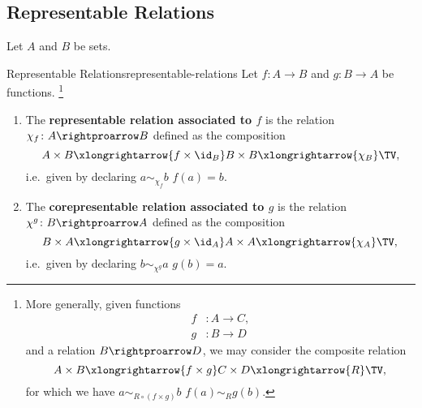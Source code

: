 \subsection{Representable Relations}\label{subsection-representable-relations}
Let $A$ and $B$ be sets.
\begin{definition}{Representable Relations}{representable-relations}%
    Let $f\colon A\to B$ and $g\colon B\to A$ be functions.%
    \footnote{%
        More generally, given functions
        \begin{align*}
            f &\colon A \to C,\\
            g &\colon B \to D
        \end{align*}
        and a relation $B\rightproarrow D$, we may consider the composite relation
        \[
            A\times B%
            \xlongrightarrow{f\times g}%
            C\times D%
            \xlongrightarrow{R}%
            \TV,%
        \]%
        for which we have $a\sim_{R\circ(f\times g)}b$ \textiff $f(a)\sim_{R}g(b)$.
        \par\vspace*{-1.75\baselineskip}
    }%
    \begin{enumerate}
        \item The \textbf{representable relation associated to $f$} is the relation $\chi_{f}\colon A\rightproarrow B$ defined as the composition%
            \[
                A\times B%
                \xlongrightarrow{f\times\id_{B}}%
                B\times B%
                \xlongrightarrow{\chi_{B}}%
                \TV,%
            \]%
            i.e.\ given by declaring $a\sim_{\chi_{f}}b$ \textiff $f(a)=b$.
        \item The \textbf{corepresentable relation associated to $g$} is the relation $\chi^{g}\colon B\rightproarrow A$ defined as the composition%
            \[
                B\times A%
                \xlongrightarrow{g\times\id_{A}}%
                A\times A%
                \xlongrightarrow{\chi_{A}}%
                \TV,%
            \]%
            i.e.\ given by declaring $b\sim_{\chi^{g}}a$ \textiff $g(b)=a$.
    \end{enumerate}
\end{definition}
